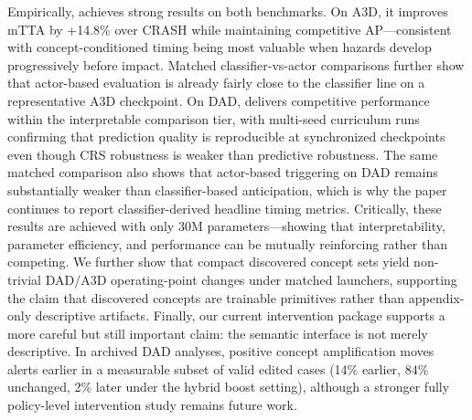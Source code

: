 Empirically, \method{} achieves strong results on both benchmarks.
On A3D, it improves mTTA by +14.8\% over CRASH while maintaining
competitive AP---consistent with concept-conditioned timing being most
valuable when hazards develop progressively before impact. Matched
classifier-vs-actor comparisons further show that actor-based evaluation is
already fairly close to the classifier line on a representative A3D
checkpoint.
On DAD, \method{} delivers competitive performance within the
interpretable comparison tier, with multi-seed curriculum runs confirming
that prediction quality is reproducible at synchronized checkpoints even though
CRS robustness is weaker than predictive robustness. The same matched
comparison also shows that actor-based triggering on DAD remains substantially
weaker than classifier-based anticipation, which is why the paper continues to
report classifier-derived headline timing metrics.
Critically, these results are achieved with only 30M parameters---showing
that interpretability, parameter efficiency, and performance can be
mutually reinforcing rather than competing. We further show that compact
discovered concept sets yield non-trivial DAD/A3D operating-point changes under
matched launchers, supporting the claim that discovered concepts are trainable
primitives rather than appendix-only descriptive artifacts.
Finally, our current intervention package supports a more careful but still
important claim: the semantic interface is not merely descriptive. In archived
DAD analyses, positive concept amplification moves alerts earlier in a
measurable subset of valid edited cases (14\% earlier, 84\% unchanged, 2\%
later under the hybrid boost setting), although a stronger fully policy-level
intervention study remains future work.

